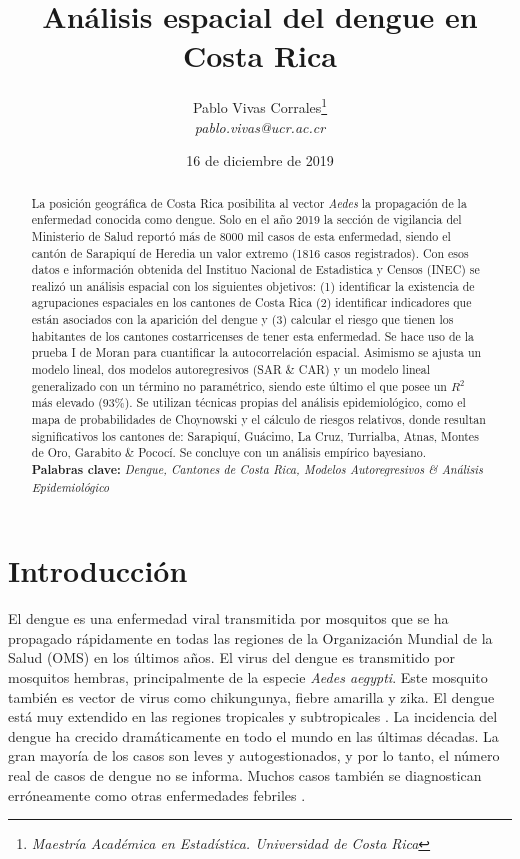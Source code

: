 \documentclass[12pt,a4paper]{article}
\author{Pablo Vivas Corrales\footnote{\textit{Maestría Académica en Estadística. Universidad de Costa Rica}}\\\textit{pablo.vivas@ucr.ac.cr}}
\title{Análisis espacial del dengue en Costa Rica}
\date{16 de diciembre de 2019}
\begin{document}
\maketitle
\begin{abstract}
\noindent
La posición geográfica de Costa Rica posibilita al vector \textit{Aedes} la propagación de la enfermedad conocida como dengue. Solo en el año 2019 la sección de vigilancia del Ministerio de Salud reportó más de 8000 mil casos de esta enfermedad, siendo el cantón de Sarapiquí de Heredia un valor extremo (1816 casos registrados). Con esos datos e información obtenida del Instituo Nacional de Estadistica y Censos (INEC) se realizó un análisis espacial con los siguientes objetivos: (1) identificar la existencia de agrupaciones espaciales en los cantones de Costa Rica (2) identificar indicadores que están asociados con la aparición del dengue y (3) calcular el riesgo que tienen los habitantes de los cantones costarricenses de tener esta enfermedad. Se hace uso de la prueba I de Moran para cuantificar la autocorrelación espacial. Asimismo se ajusta un modelo lineal, dos modelos autoregresivos (SAR \& CAR) y un modelo lineal generalizado con un término no paramétrico, siendo este último el que posee un $R^{2}$ más elevado (93\%). Se utilizan técnicas propias del análisis epidemiológico, como el mapa de probabilidades de Choynowski y el cálculo de riesgos relativos, donde resultan significativos los cantones de: Sarapiquí, Guácimo, La Cruz, Turrialba, Atnas, Montes de Oro, Garabito \& Pococí. Se concluye con un análisis empírico bayesiano.\\
\textbf{Palabras clave:} \textit{Dengue, Cantones de Costa Rica, Modelos Autoregresivos \& Análisis Epidemiológico} 
\end{abstract}
\section{Introducción}

El dengue es una enfermedad viral transmitida por mosquitos que se ha propagado rápidamente en todas las regiones de la Organización Mundial de la Salud (OMS) en los últimos años. El virus del dengue es transmitido por mosquitos hembras, principalmente de la especie \textit{Aedes aegypti}. Este mosquito también es vector de virus como chikungunya, fiebre amarilla y zika. El dengue está muy extendido en las regiones tropicales y subtropicales \cite{OMS}. La incidencia del dengue ha crecido dramáticamente en todo el mundo en las últimas décadas. La gran mayoría de los casos son leves y autogestionados, y por lo tanto, el número real de casos de dengue no se informa. Muchos casos también se diagnostican erróneamente como otras enfermedades febriles \cite{Waggoner2016}.\\
\end{document}
